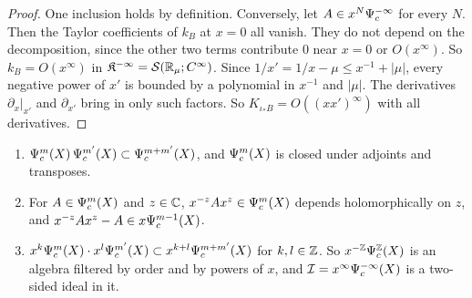 \begin{proof}
One inclusion holds by definition. Conversely, let \(A\in
x^N\Psi_{c}^{-\infty}\) for every \(N\). Then the Taylor coefficients of
\(k_B\) at \(x=0\) all vanish. They do not depend on the decomposition,
since the other two terms contribute \(0\) near \(x=0\) or
\(O(x^\infty)\). So \(k_B=O(x^\infty)\) in
\(\mathfrak K^{-\infty}=\mathcal S(\mathbb R_\mu;C^\infty)\). Since
\(1/x'=1/x-\mu\le x^{-1}+|\mu|\), every negative power of \(x'\) is
bounded by a polynomial in \(x^{-1}\) and \(|\mu|\). The derivatives
\(\partial_x|_{x'}\) and \(\partial_{x'}\) bring in only such factors. So
\(K_{\iota_*B}=O((xx')^\infty)\) with all derivatives.
\end{proof}

\begin{theorem}
\label{cc:thm:comp}
\begin{enumerate}
\item \(\Psi_{c}^m(X)\,\Psi_{c}^{m'}(X)\subset\Psi_{c}^{m+m'}(X)\), and
\(\Psi_{c}^m(X)\) is closed under adjoints and transposes.
\item For \(A\in\Psi_{c}^m(X)\) and \(z\in\mathbb C\), \(x^{-z}Ax^z\in\Psi_{c}^m(X)\)
depends holomorphically on \(z\), and \(x^{-z}Ax^z-A\in x\Psi_{c}^{m-1}(X)\).
\item \(x^k\Psi_{c}^m(X)\cdot x^l\Psi_{c}^{m'}(X)\subset x^{k+l}\Psi_{c}^{m+m'}
(X)\) for \(k,l\in\mathbb Z\). So \(x^{-\mathbb Z}\Psi_{c}^{\mathbb Z}(X)\) is an algebra filtered
by order and by powers of \(x\), and \(\mathcal I=x^\infty\Psi_{c}^{-\infty}(X)\) is
a two-sided ideal in it.
\end{enumerate}
\end{theorem}

